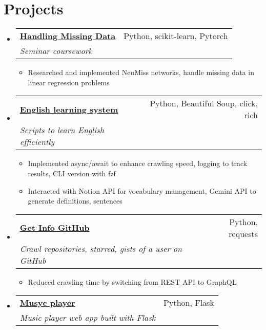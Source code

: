 \documentclass[letterpaper,11pt]{article}
\makeatletter
\newcommand{\heading}[4]{
    \normalsize
    \begin{tabular*}{0.97\textwidth}[t]{l@{\extracolsep{\fill}}r}
      \textbf{#1} & #2 \\[-2pt]
      \textit{\small#3} & \textit{\small #4}
    \end{tabular*}
    \vspace{-2pt}
}
\makeatother
\begin{document}
\section{Projects}
\begin{itemize}
    \item \heading{\href{https://github.com/ngntrgduc/seminar}{Handling Missing Data \faGithub}}
        {Python, scikit-learn, Pytorch}{Seminar coursework}{}
        \begin{itemize}
            \item Researched and implemented NeuMiss networks, handle missing data in linear regression problems
        \end{itemize}
    
    \item \heading{\href{https://github.com/ngntrgduc/english-learning-system}{English learning system \faGithub}}
        {Python, Beautiful Soup, click, rich}{Scripts to learn English efficiently}{}
        \begin{itemize}
            \item Implemented async/await to enhance crawling speed, logging to track results, CLI version with fzf
            \item Interacted with Notion API for vocabulary management, Gemini API to generate definitions, sentences
        \end{itemize}

    \item \heading{\href{https://github.com/ngntrgduc/get-info-github}{Get Info GitHub \faGithub}}
        {Python, requests}{Crawl repositories, starred, gists of a user on GitHub}{}
        \begin{itemize}
            \item Reduced crawling time by switching from REST API to GraphQL
        \end{itemize}
    
    \item \heading{\href{https://github.com/ngntrgduc/musyc-player}{Musyc player \faGithub}}
        {Python, Flask}{Music player web app built with Flask}{}


\end{itemize}
\end{document}
